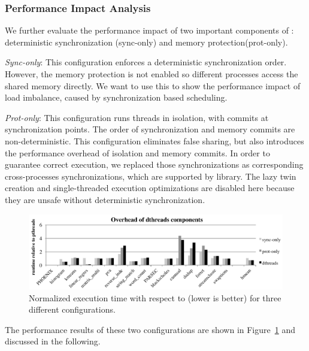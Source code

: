\subsubsection{Performance Impact Analysis}
We further evaluate the performance impact of two important components of \dthreads: deterministic synchronization (sync-only) and memory protection(prot-only).

\emph{Sync-only}: This configuration enforces a deterministic synchronization order. However, the memory protection is not enabled so different processes access the shared memory directly. We want to use this to show the performance impact of load imbalance, caused by synchronization based scheduling.

\emph{Prot-only}: This configuration runs threads in isolation, with commits at synchronization points. The order of synchronization and memory commits are non-deterministic. This configuration eliminates false sharing, but also introduces the performance overhead of isolation and memory commits. In order to guarantee correct execution, we replaced those synchronizations as corresponding cross-processes synchronizations, which are supported by \pthreads{} library. The lazy twin creation and single-threaded execution optimizations are disabled here because they are unsafe without deterministic synchronization.


\begin{figure}[!t]
{\centering
\includegraphics[width=6.25in]{dthreads/figure/perfeffect}
\caption{Normalized execution time with respect to \pthreads{} (lower is better) for three different configurations. 
\label{fig:perfanalysis}}
}
\end{figure}

The performance results of these two configurations are shown in Figure~\ref{fig:perfanalysis} and discussed in the following.


